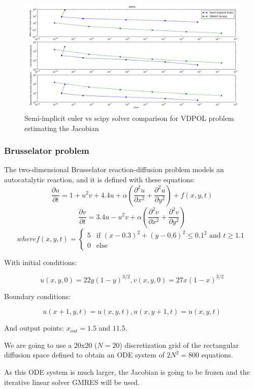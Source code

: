 \documentclass[12pt]{article}
\begin{document}
\begin{figure}[h]
 \includegraphics[scale=0.3]{implicit_images/VDPOL_ng.png}
\centering
\caption{Semi-implicit euler vs scipy solver comparison for VDPOL problem estimating the Jacobian}
\end{figure}

\subsubsection{Brusselator problem}
The two-dimensional Brusselator reaction-diffusion problem models an autocatalytic reaction, and it is defined with these equations:
$$\frac{\partial u}{\partial t} = 1+u^{2}v+4.4u+\alpha (\frac{\partial^{2} u}{\partial x^{2}}+\frac{\partial^{2} u}{\partial y^{2}})+f(x,y,t)$$
$$\frac{\partial v}{\partial t} = 3.4u-u^{2}v+\alpha (\frac{\partial^{2} v}{\partial x^{2}}+\frac{\partial^{2} v}{\partial y^{2}})$$
$$where f(x,y,t) = \begin{cases} 5 & \mbox{if } (x-0.3)^{2}+(y-0.6)^2\leq0.1^{2} \mbox{ and } t\geq1.1 \\ 0 & \mbox{else } \end{cases}$$

With initial conditions:

$$u(x,y,0)=22y(1-y)^{3/2}, v(x,y,0)=27x(1-x)^{3/2}$$

Boundary conditions:

$$u(x+1,y,t)=u(x,y,t), u(x,y+1,t)=u(x,y,t)$$

And output points: $x_{out}=1.5$ and $11.5$.

We are going to use a 20x20 ($N=20$) discretization grid of the rectangular diffusion space defined to obtain an ODE system of $2N^{2}=800$ equations.

As this ODE system is much larger, the Jacobian is going to be frozen and the iterative linear solver GMRES will be used.
\end{document}

